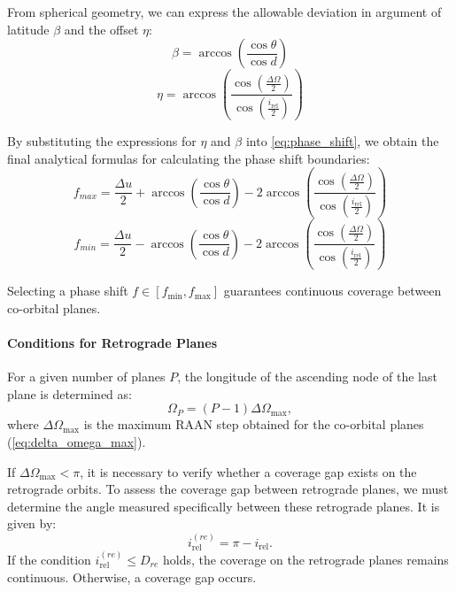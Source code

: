 From spherical geometry, we can express the allowable deviation in argument of latitude $\beta$ and
the offset $\eta$:
\begin{equation}
    \beta = \arccos \left(  \frac{\cos \theta}{\cos d} \right)
\end{equation}
\begin{equation}
    \eta = \arccos \left( \frac{\cos(\frac{\Delta\Omega}{2})}{\cos(\frac{i_{\mathrm{rel}}}{2})} \right)
\end{equation}

By substituting the expressions for \(\eta\) and \(\beta\) into \eqref{eq:phase_shift}, we obtain
the final analytical formulas for calculating the phase shift boundaries:
\begin{equation}
    f_{max} = \frac{\Delta u}{2} + \arccos \left( \frac{\cos \theta}{\cos d} \right)
    - 2 \arccos \left( \frac{\cos\left(\frac{\Delta\Omega}{2}\right)}{\cos\left(
        \frac{i_{\mathrm{rel}}}{2}\right)} \right)
\end{equation}
\begin{equation}
    f_{min} = \frac{\Delta u}{2} - \arccos \left( \frac{\cos \theta}{\cos d} \right)
    - 2 \arccos \left( \frac{\cos\left(\frac{\Delta\Omega}{2}\right)}{\cos\left(
        \frac{i_{\mathrm{rel}}}{2}\right)} \right)
\end{equation}

Selecting a phase shift \(f \in [f_{\min}, f_{\max}]\) guarantees continuous coverage between
co-orbital planes.


\paragraph{Conditions for Retrograde Planes}

For a given number of planes \(P\), the longitude of the ascending node of the last plane is
determined as:
\begin{equation}
    \Omega_P = (P-1)\Delta\Omega_{\text{max}},
\end{equation}
where \(\Delta\Omega_{\text{max}}\) is the maximum RAAN step obtained for the co-orbital planes
(\ref{eq:delta_omega_max}).

If \(\Delta\Omega_{\text{max}} < \pi\), it is necessary to verify whether a coverage gap exists on
the retrograde orbits.
To assess the coverage gap between retrograde planes, we must determine the angle measured
specifically between these retrograde planes. It is given by:
\begin{equation}
    i_{\mathrm{rel}}^{(re)} = \pi - i_{\mathrm{rel}}.
\end{equation}
If the condition \(i_{\mathrm{rel}}^{(re)} \leq D_{re}\) holds, the coverage on the retrograde planes remains
continuous. Otherwise, a coverage gap occurs.

